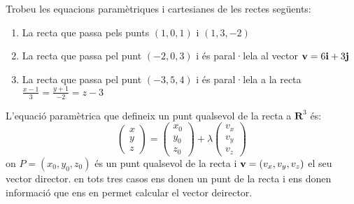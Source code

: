 \Exercise Trobeu les equacions paramètriques i cartesianes de les rectes següents:
\begin{enumerate}
  \item La recta que passa pels punts $(1,0,1)$ i $(1,3,-2)$
  \item La recta que passa pel punt $(-2,0,3)$ i és paral·lela al vector $\textbf{v}=6\textbf{i}+3\textbf{j}$
  \item La recta que passa pel punt $(-3,5,4)$ i és paral·lela a la recta $\frac{x-1}{3}=\frac{y+1}{-2}=z-3$
\end{enumerate}

\Answer L'equació paramètrica que defineix un punt qualsevol de la recta a $\mathbf{R}^3$ és:
\[
\begin{pmatrix}x\\y\\z\end{pmatrix}= \begin{pmatrix}x_0\\y_0\\z_0\end{pmatrix}+\lambda\begin{pmatrix}v_x\\v_y\\v_z\end{pmatrix}
\]
on $P=(x_0,y_0,z_0)$ és un punt qualsevol de la recta i $\textbf{v}=(v_x,v_y,v_z)$ el seu vector director. en tots tres casos ens donen un punt de la recta i ens donen informació que ens en permet calcular el vector deirector.

